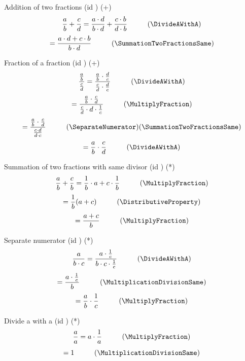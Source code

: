 \documentclass{book}
\begin{document}
                Addition of two fractions (id \AdditionTwoFractions) (+)
                \[\frac{a}{b} + \frac{c}{d} = \frac{a \cdot d}{b \cdot d} + \frac{c \cdot b}{d \cdot b} \hspace{1cm} (\DivideAWithA)\]
                \[= \frac{a \cdot d + c \cdot b}{b \cdot d} \hspace{1cm} (\SummationTwoFractionsSame)\]

                Fraction of a fraction (id \FractionOfFraction) (+)
                \[\frac{\frac{a}{b}}{\frac{c}{d}} = \frac{\frac{a}{b} \cdot \frac{d}{c}}{\frac{c}{d} \cdot \frac{d}{c}} \hspace{1cm} (\DivideAWithA)\]
                \[= \frac{\frac{a}{b} \cdot \frac{c}{d}}{\frac{c}{d} \cdot d \cdot \frac{1}{c}} \hspace{1cm} (\MultiplyFraction)\]
                \[= \frac{\frac{a}{b} \cdot \frac{c}{d}}{\frac{c \cdot d}{d \cdot c}} \hspace{1cm} (\SeparateNumerator) (\SummationTwoFractionsSame)\]
                \[= \frac{a}{b} \cdot \frac{c}{d} \hspace{1cm} (\DivideAWithA)\]

                Summation of two fractions with same divisor (id \SummationTwoFractionsSame) (*)
                \[\frac{a}{b} + \frac{c}{b} = \frac{1}{b} \cdot a + c \cdot \frac{1}{b} \hspace{1cm} (\MultiplyFraction)\]
                \[= \frac{1}{b} (a + c) \hspace{1cm} (\DistributiveProperty)\]
                \[= \frac{a + c}{b} \hspace{1cm} (\MultiplyFraction)\]

                Separate numerator (id \SeparateNumerator) (*)
                \[\frac{a}{b \cdot c} = \frac{a \cdot \frac{1}{c}}{b \cdot c \cdot \frac{1}{c}} \hspace{1cm} (\DivideAWithA)\]
                \[= \frac{a \cdot \frac{1}{c}}{b} \hspace{1cm} (\MultiplicationDivisionSame)\]
                \[= \frac{a}{b} \cdot \frac{1}{c} \hspace{1cm} (\MultiplyFraction)\]

                Divide a with a (id \DivideAWithA) (*)
                \[\frac{a}{a} = a \cdot \frac{1}{a} \hspace{1cm} (\MultiplyFraction)\]
                \[= 1 \hspace{1cm} (\MultiplicationDivisionSame)\]
\end{document}
